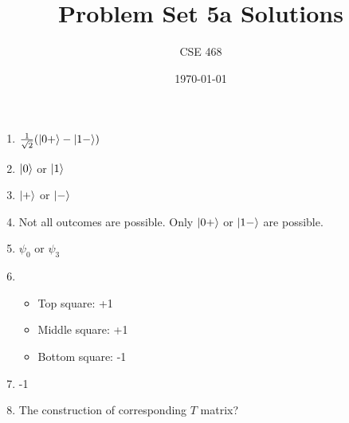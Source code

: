 \documentclass[12pt]{article}
\title{Problem Set 5a Solutions}
\author{CSE 468}
\date{\today}
\begin{document}
\maketitle

\begin{enumerate}[font=\bfseries]
    \item $\frac{1}{\sqrt{2}}(\ket{0+} - \ket{1-})$
    \item $\ket{0}$ or $\ket{1}$
    \item $\ket{+}$ or $\ket{-}$
    \item Not all outcomes are possible. Only $\ket{0+}$ or $\ket{1-}$ are possible.
    \item $\psi_0$ or $\psi_3$
    \item \begin{itemize}
        \item Top square: +1
        \item Middle square: +1
        \item Bottom square: -1
    \end{itemize}
    \item -1
    \item The construction of corresponding $T$ matrix?
    
\end{enumerate}
\end{document}
